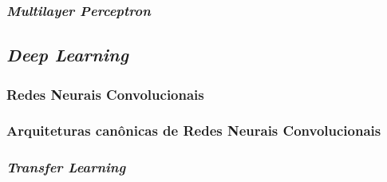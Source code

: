 
\subsubsection{\emph{Multilayer Perceptron}}
\label{subsubsec:mlp}




\subsection{\emph{Deep Learning}}
\label{subsec:dl}

\subsubsection{Redes Neurais Convolucionais}
\label{subsubsec:cnns}



\subsubsection{Arquiteturas canônicas de Redes Neurais Convolucionais}
\label{subsubsec:arq-cnns}

\subsubsection{\emph{Transfer Learning}}
\label{subsubsec:transfer}
